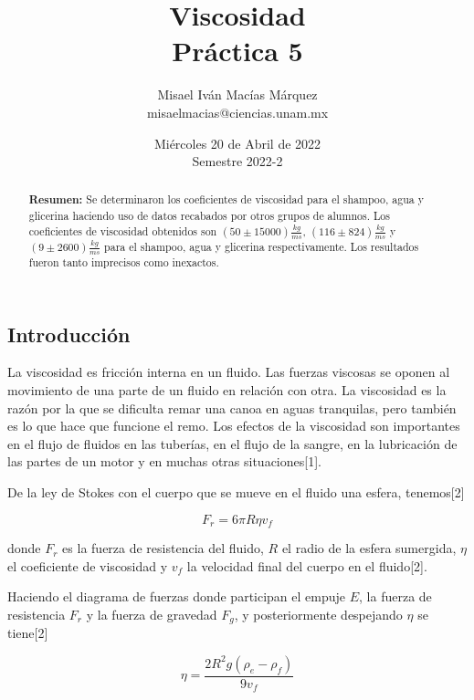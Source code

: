 \documentclass[DIV=calc, paper=a4, fontsize=11pt]{scrartcl}
\title{Viscosidad\\ %
Práctica 5} %
\author{Misael Iván Macías Márquez\\
misaelmacias@ciencias.unam.mx}
\date{Miércoles 20 de Abril de 2022\\Semestre 2022-2}
\begin{document}
\maketitle


\begin{abstract}
\textbf{Resumen:} Se determinaron los coeficientes de viscosidad para el shampoo, agua y glicerina haciendo uso de datos recabados por otros grupos de alumnos. Los coeficientes de viscosidad obtenidos son $(50 \pm 15000)\frac{kg}{ms}$, $(116 \pm 824) \frac{kg}{ms}$ y $(9 \pm 2600) \frac{kg}{ms}$ para el shampoo, agua y glicerina respectivamente. Los resultados fueron tanto imprecisos como inexactos.
\end{abstract}

\begin{multicols}{2}




\section*{Introducción}

La viscosidad es fricción interna en un fluido. Las fuerzas viscosas se oponen al movimiento de una parte de un fluido en relación con otra. La viscosidad es la razón por la que se dificulta remar una canoa en aguas tranquilas, pero también es lo que hace que funcione el remo. Los efectos de la viscosidad son importantes en el flujo de fluidos en las tuberías, en el flujo de la sangre, en la lubricación de las partes de un motor y en muchas otras situaciones[1].

De la ley de Stokes con el cuerpo que se mueve en el fluido una esfera, tenemos[2]

\begin{equation*}
    F_r = 6 \pi R \eta v_f
\end{equation*}

donde $F_r$ es la fuerza de resistencia del fluido, $R$ el radio de la esfera sumergida, $\eta$ el coeficiente de viscosidad y $v_f$ la velocidad final del cuerpo en el fluido[2].

Haciendo el diagrama de fuerzas donde participan el empuje $E$, la fuerza de resistencia $F_r$ y la fuerza de gravedad $F_g$, y posteriormente despejando $\eta$ se tiene[2]



\begin{equation}
    \eta = \frac{2R^2 g(\rho_e - \rho_f)}{9 v_f}
\end{equation}


\end{multicols}
\end{document}
